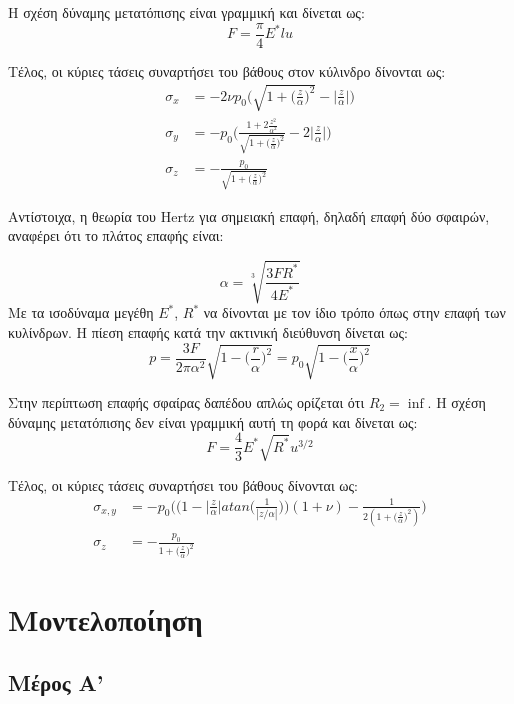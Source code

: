 \documentclass{article}
\begin{document}
Η σχέση δύναμης μετατόπισης είναι γραμμική και δίνεται ως:
\begin{equation}
    F = \frac{\pi}{4}E^* l u
\end{equation}

Τέλος, οι κύριες τάσεις συναρτήσει του βάθους στον κύλινδρο δίνονται ως:
\begin{align}
    \sigma_x &= -2\nu p_0 \bigg(\sqrt{1 + \bigg(\frac{z}{\alpha}\bigg)^2} - \bigg|\frac{z}{\alpha}\bigg|\bigg)\\

    \sigma_y &= - p_0 \Bigg(\frac{1+2\frac{z^2}{\alpha^2}}{\sqrt{1 + \bigg(\frac{z}{\alpha}\bigg)^2}} - 2\bigg|\frac{z}{\alpha}\bigg|\Bigg)\\

    \sigma_z &= -\frac{p_0}{\sqrt{1 + \bigg(\frac{z}{\alpha}\bigg)^2}}
\end{align}



Αντίστοιχα, η θεωρία του Hertz για σημειακή επαφή, δηλαδή επαφή δύο σφαιρών,  αναφέρει ότι το πλάτος επαφής είναι:

\begin{equation}
    \alpha = \sqrt[3]{\frac{3 F R^*}{4 E^*}}
\end{equation}
Με τα ισοδύναμα μεγέθη $Ε^*$, $R^*$ να δίνονται με τον ίδιο τρόπο όπως στην επαφή των κυλίνδρων. Η πίεση επαφής κατά την ακτινική διεύθυνση δίνεται ως:
\begin{equation}
    p = \frac{3F}{2\pi \alpha^2} \sqrt{1 - \bigg(\frac{r}{\alpha}\bigg)^2} = p_0\sqrt{1 - \bigg(\frac{x}{\alpha}\bigg)^2}
\end{equation}

Στην περίπτωση επαφής σφαίρας δαπέδου απλώς ορίζεται ότι $R_2 = \inf$. Η σχέση δύναμης μετατόπισης δεν είναι γραμμική αυτή τη φορά και δίνεται ως:
\begin{equation}
    F = \frac{4}{3}E^* \sqrt{R^*} u^{3/2}
\end{equation}

Τέλος, οι κύριες τάσεις συναρτήσει του βάθους δίνονται ως:
\begin{align}
    \sigma_{x,y} &= - p_0 \bigg( \bigg(1-\bigg|\frac{z}{\alpha}\bigg| atan\bigg(\frac{1}{|z/\alpha|}\bigg)\bigg)(1+\nu)  - \frac{1}{2 (1 + \bigg(\frac{z}{\alpha}\bigg)^2)} \bigg)\\

    \sigma_z &= -\frac{p_0}{1 + \bigg(\frac{z}{\alpha}\bigg)^2}
\end{align}

\section{Μοντελοποίηση}

\subsection{Μέρος Α'}
\end{document}
